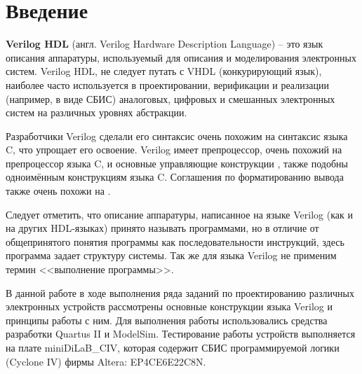 





\tableofcontents
\newpage
\listoffigures
\listoftables
\lstlistoflistings
\newpage

\graphicspath{{../lab1/pics/}}

\section*{Введение}



\textbf{Verilog HDL} (англ. Verilog Hardware Description Language) -- это язык описания аппаратуры, используемый для описания и моделирования электронных систем. Verilog HDL, не следует путать с VHDL (конкурирующий язык), наиболее часто используется в проектировании, верификации и реализации (например, в виде СБИС) аналоговых, цифровых и смешанных электронных систем на различных уровнях абстракции.

Разработчики Verilog сделали его синтаксис очень похожим на синтаксис языка C, что упрощает его освоение. Verilog имеет препроцессор, очень похожий на препроцессор языка C, и основные управляющие конструкции ,  также подобны одноимённым конструкциям языка C. Соглашения по форматированию вывода также очень похожи на .

Следует отметить, что описание аппаратуры, написанное на языке Verilog (как и на других HDL-языках) принято называть программами, но в отличие от общепринятого понятия программы как последовательности инструкций, здесь программа задает структуру системы. Так же для языка Verilog не применим термин <<выполнение программы>>.

В данной работе в ходе выполнения ряда заданий по проектированию различных электронных устройств рассмотрены основные конструкции языка Verilog и принципы работы с ним. Для выполнения работы использовались средства разработки Quartus II и ModelSim. Тестирование работы устройств выполняется на плате miniDiLaB\_CIV, которая содержит СБИС программируемой логики (Cyclone IV) фирмы Altera: EP4CE6E22C8N.

